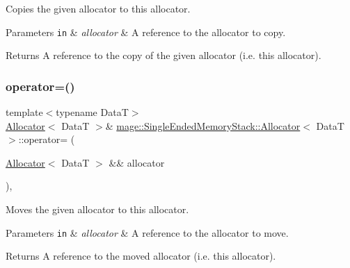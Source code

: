 Copies the given allocator to this allocator.


\begin{DoxyParams}[1]{Parameters}
\mbox{\tt in}  & {\em allocator} & A reference to the allocator to copy. \\
\hline
\end{DoxyParams}
\begin{DoxyReturn}{Returns}
A reference to the copy of the given allocator (i.\+e. this allocator). 
\end{DoxyReturn}
\hypertarget{structmage_1_1_single_ended_memory_stack_1_1_allocator_a0e903bdc1db47ed80daa907eccfd2b74}{}\label{structmage_1_1_single_ended_memory_stack_1_1_allocator_a0e903bdc1db47ed80daa907eccfd2b74} 
\subsubsection{\texorpdfstring{operator=()}{operator=()}\hspace{0.1cm}{\footnotesize\ttfamily [2/2]}}
{\footnotesize\ttfamily template$<$typename DataT$>$ \\
\hyperlink{structmage_1_1_single_ended_memory_stack_1_1_allocator}{Allocator}$<$ DataT $>$\& \hyperlink{structmage_1_1_single_ended_memory_stack_1_1_allocator}{mage\+::\+Single\+Ended\+Memory\+Stack\+::\+Allocator}$<$ DataT $>$\+::operator= (\begin{DoxyParamCaption}\item[{\hyperlink{structmage_1_1_single_ended_memory_stack_1_1_allocator}{Allocator}$<$ DataT $>$ \&\&}]{allocator }\end{DoxyParamCaption})\hspace{0.3cm}{\ttfamily [delete]}, {\ttfamily [noexcept]}}

Moves the given allocator to this allocator.


\begin{DoxyParams}[1]{Parameters}
\mbox{\tt in}  & {\em allocator} & A reference to the allocator to move. \\
\hline
\end{DoxyParams}
\begin{DoxyReturn}{Returns}
A reference to the moved allocator (i.\+e. this allocator). 
\end{DoxyReturn}
\hypertarget{structmage_1_1_single_ended_memory_stack_1_1_allocator_aec97233e7d20f8edc93b4cedb8fac71c}{}\label{structmage_1_1_single_ended_memory_stack_1_1_allocator_aec97233e7d20f8edc93b4cedb8fac71c} 

